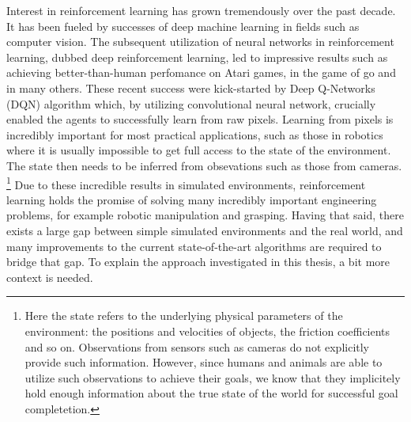 Interest in reinforcement learning has grown tremendously over the past decade.
It has been fueled by successes of deep machine learning in fields such as computer vision.
The subsequent utilization of neural networks in reinforcement learning,
dubbed deep reinforcement learning,
led to impressive results such as achieving better-than-human
perfomance on Atari games, in the game of go and in many others.
These recent success were kick-started by Deep Q-Networks (DQN) algorithm which,
by utilizing convolutional neural network, crucially enabled the agents to successfully learn from raw pixels.
Learning from pixels is incredibly important for most practical applications,
such as those in robotics
where it is usually impossible to get full access to the state of the environment.
The state then needs to be inferred from obsevations such as those from cameras.
\footnote{Here the state refers to the underlying physical parameters of the environment:
the positions and velocities of objects, the friction coefficients and so on.
Observations from sensors such as cameras do not explicitly provide such information.
However, since humans and animals are able to utilize such observations to achieve their
goals, we know that they implicitely hold enough information about the true state
of the world for successful goal completetion.}
Due to these incredible results in simulated environments,
reinforcement learning holds the promise of solving
many incredibly important engineering problems, for example robotic manipulation
and grasping.
Having that said, there exists a large gap between simple simulated environments and
the real world,
and many improvements to the current state-of-the-art algorithms are required to
bridge that gap.
To explain the approach investigated in this thesis,
a bit more context is needed.


